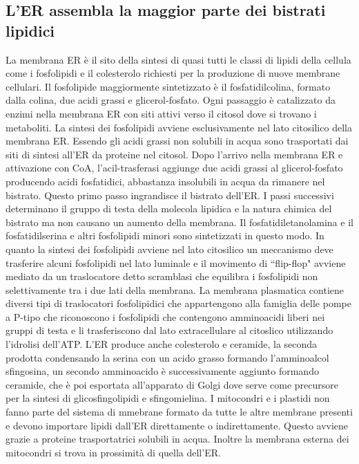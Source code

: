 \subsection{L'ER assembla la maggior parte dei bistrati lipidici}
La membrana ER \`e il sito della sintesi di quasi tutti le classi di lipidi della cellula come i fosfolipidi e il colesterolo richiesti per la produzione di nuove membrane cellulari. 
Il fosfolipide maggiormente sintetizzato \`e il fosfatidilcolina, formato dalla colina, due acidi grassi  e glicerol-fosfato. Ogni passaggio \`e catalizzato da enzimi nella membrana ER
con siti attivi verso il citosol dove si trovano i metaboliti. La sintesi dei fosfolipidi avviene esclusivamente nel lato citosilico della membrana ER. Essendo gli acidi grassi non
solubili in acqua sono trasportati dai siti di sintesi all'ER da proteine nel citosol. Dopo l'arrivo nella membrana ER e attivazione con CoA, l'acil-trasferasi aggiunge due acidi
grassi al glicerol-fosfato producendo acidi fosfatidici, abbastanza insolubili in acqua da rimanere nel bistrato. Questo primo passo ingrandisce il bistrato dell'ER. I passi successivi
determinano il gruppo di testa della molecola lipidica e la natura chimica del bistrato ma non causano un aumento della membrana. Il fosfatidiletanolamina e il fosfatidilserina e altri
fosfolipidi minori sono sintetizzati in questo modo. In quanto la sintesi dei fosfolipidi avviene nel lato citosilico un meccanismo deve trasferire alcuni fosfolipidi nel lato 
luminale e il movimento di ``flip-flop" avviene mediato da un traslocatore detto scramblasi che equilibra i fosfolipidi non selettivamente tra i due lati della membrana. La membrana
plasmatica contiene diversi tipi di traslocatori fosfolipidici che appartengono alla famiglia delle pompe a P-tipo che riconoscono i fosfolipidi che contengono amminoacidi liberi nei
gruppi di testa e li trasferiscono dal lato extracellulare al citoslico utilizzando l'idrolisi dell'ATP. L'ER produce anche colesterolo e ceramide, la seconda prodotta condensando la 
serina con un acido grasso formando l'amminoalcol sfingosina, un secondo amminoacido \`e successivamente aggiunto formando ceramide, che \`e poi esportata all'apparato di Golgi dove
serve come precursore per la sintesi di glicosfingolipidi e sfingomielina. I mitocondri e i plastidi non fanno parte del sistema di mmebrane formato da tutte le altre membrane presenti
e devono importare lipidi dall'ER direttamente o indirettamente. Questo avviene grazie a proteine trasportatrici solubili in acqua. Inoltre la membrana esterna dei mitocondri si trova
in prossimit\`a di quella dell'ER. 
